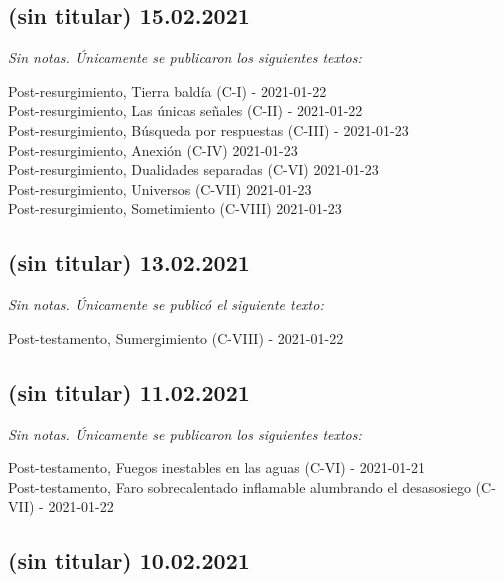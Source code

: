 \documentclass[
  spanish,
]{book}
\begin{document}
\hypertarget{sin-titular-15.02.2021}{%
\subsection*{(sin titular) 15.02.2021}\label{sin-titular-15.02.2021}}

\emph{Sin notas. Únicamente se publicaron los siguientes textos:}

Post-resurgimiento, Tierra baldía (C-I) - 2021-01-22~\\
Post-resurgimiento, Las únicas señales (C-II) - 2021-01-22~\\
Post-resurgimiento, Búsqueda por respuestas (C-III) - 2021-01-23~\\
Post-resurgimiento, Anexión (C-IV) 2021-01-23~\\
Post-resurgimiento, Dualidades separadas (C-VI) 2021-01-23~\\
Post-resurgimiento, Universos (C-VII) 2021-01-23~\\
Post-resurgimiento, Sometimiento (C-VIII) 2021-01-23

\hypertarget{sin-titular-13.02.2021}{%
\subsection*{(sin titular) 13.02.2021}\label{sin-titular-13.02.2021}}

\emph{Sin notas. Únicamente se publicó el siguiente texto:}

Post-testamento, Sumergimiento (C-VIII) - 2021-01-22

\hypertarget{sin-titular-11.02.2021}{%
\subsection*{(sin titular) 11.02.2021}\label{sin-titular-11.02.2021}}

\emph{Sin notas. Únicamente se publicaron los siguientes textos:}

Post-testamento, Fuegos inestables en las aguas (C-VI) - 2021-01-21~\\
Post-testamento, Faro sobrecalentado inflamable alumbrando el desasosiego (C-VII) - 2021-01-22

\hypertarget{sin-titular-10.02.2021}{%
\subsection*{(sin titular) 10.02.2021}\label{sin-titular-10.02.2021}}
\end{document}
